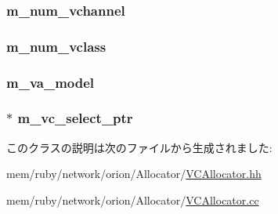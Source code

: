 \label{classVCAllocator_a56cb909217f28866d2a08a40adb3ef08}
\hypertarget{classVCAllocator_ac0b1d8a0523e7c7ce285c7917a764c9f}{
\subsubsection[{m\_\-num\_\-vchannel}]{ {\bf m\_\-num\_\-vchannel}}}
\label{classVCAllocator_ac0b1d8a0523e7c7ce285c7917a764c9f}
\hypertarget{classVCAllocator_ac6cc31c075b331538b0aaa0bb593b2e3}{
\subsubsection[{m\_\-num\_\-vclass}]{ {\bf m\_\-num\_\-vclass}}}
\label{classVCAllocator_ac6cc31c075b331538b0aaa0bb593b2e3}
\hypertarget{classVCAllocator_aed33459ed8901eb1f02e4f90785a655f}{
\subsubsection[{m\_\-va\_\-model}]{ {\bf m\_\-va\_\-model}}}
\label{classVCAllocator_aed33459ed8901eb1f02e4f90785a655f}
\hypertarget{classVCAllocator_aebc14356cedcf94a99d5ec2d6cde741f}{
\subsubsection[{m\_\-vc\_\-select\_\-ptr}]{$\ast$ {\bf m\_\-vc\_\-select\_\-ptr}}}
\label{classVCAllocator_aebc14356cedcf94a99d5ec2d6cde741f}


このクラスの説明は次のファイルから生成されました:\begin{DoxyCompactItemize}
\item 
mem/ruby/network/orion/Allocator/\hyperlink{VCAllocator_8hh}{VCAllocator.hh}\item 
mem/ruby/network/orion/Allocator/\hyperlink{VCAllocator_8cc}{VCAllocator.cc}\end{DoxyCompactItemize}
